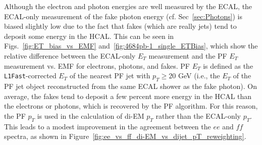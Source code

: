 \documentclass[dissertation.tex]{subfiles}
\begin{document}

Although the electron and photon energies are well measured by the ECAL, the ECAL-only measurement of the fake photon energy (cf. Sec~\ref{sec:Photons}) is biased slightly low due to the fact that fakes (which are really jets) tend to deposit some energy in the HCAL.  This can be seen in Figs.~\ref{fig:ET_bias_vs_EMF} and~\ref{fig:4684pb-1_single_ETBias}, which show the relative difference between the ECAL-only $E_{T}$ measurement and the PF $E_{T}$ measurement vs. EMF for electrons, photons, and fakes.  PF $E_{T}$ is defined as the \verb+L1Fast+-corrected $E_{T}$ of the nearest PF jet with $p_{T} \geq 20$ GeV (i.e., the $E_{T}$ of the PF jet object reconstructed from the same ECAL shower as the fake photon).  On average, the fakes tend to deposit a few percent more energy in the HCAL than the electrons or photons, which is recovered by the PF algorithm.  For this reason, the PF $p_{T}$ is used in the calculation of di-EM $p_{T}$ rather than the ECAL-only $p_{T}$.  This leads to a modest improvement in the agreement between the $ee$ and $\mathit{ff}$ \MET spectra, as shown in Figure~\ref{fig:ee_vs_ff_di-EM_vs_dijet_pT_reweighting}.
\end{document}
